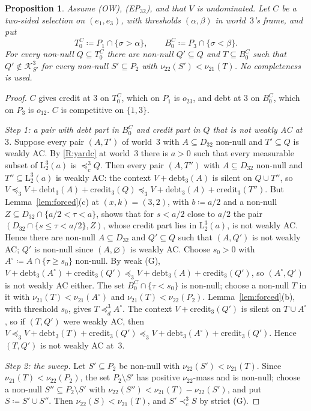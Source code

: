 \documentclass[11pt]{article}
\newtheorem{proposition}[theorem]{Proposition}
\theoremstyle{definition}\newtheorem{definition}[theorem]{Definition}
\theoremstyle{remark}\newtheorem{remark}[theorem]{Remark}
\newcommand{\debt}{\mathrm{debt}}
\newcommand{\cred}{\mathrm{credit}}
\newcommand{\Kid}{\mathcal K}
\newcommand{\Lo}[3]{\mathrm L^{#1}_{#2}(#3)}
\begin{document}
\begin{proposition}\label{prop:heavy3}
Assume (OW), (EP$_{32}$), and that $V$ is undominated. Let $C$ be a
two-sided selection on $(e_1,e_3)$, with thresholds $(\alpha,\beta)$ in
world~$3$'s frame, and put
\[
 T^C_0\coloneqq P_1\cap\{\sigma>\alpha\},\qquad
 B^C_0\coloneqq P_3\cap\{\sigma<\beta\}.
\]
For every non-null $Q\subseteq T^C_0$ there are non-null $Q'\subseteq Q$ and
$T\subseteq B^C_0$ such that $Q'\notin\Kid^3_{S'}$ for every non-null
$S'\subseteq P_2$ with $\nu_{22}(S')<\nu_{21}(T)$. No completeness is used.
\end{proposition}
\begin{proof}
$C$ gives credit at $3$ on $T^C_0$, which on $P_1$ is $o_{23}$, and debt at
$3$ on $B^C_0$, which on $P_3$ is $o_{12}$. $C$ is competitive on
$\{1,3\}$.

\emph{Step 1: a pair with debt part in $B^C_0$ and credit part in $Q$ that
is not weakly AC at~$3$.} Suppose every pair $(A,T')$ of world~$3$ with
$A\subseteq D_{32}$ non-null and $T'\subseteq Q$ is weakly AC. By
\ref{R:yardc} at world~$3$ there is $a>0$ such that every measurable subset
of $\Lo32a$ is $\preceq^3_cQ$. Then every pair $(A,T'')$ with $A\subseteq
D_{32}$ non-null and $T''\subseteq\Lo32a$ is weakly AC: the context
$V+\debt_3(A)$ is silent on $Q\cup T''$, so
$V\preceq_3V+\debt_3(A)+\cred_3(Q)\preceq_3V+\debt_3(A)+\cred_3(T'')$. But
Lemma~\ref{lem:forced}(c) at $(x,k)=(3,2)$, with $b\coloneqq a/2$ and a
non-null $Z\subseteq D_{32}\cap\{a/2<\tau<a\}$, shows that for $s<a/2$
close to $a/2$ the pair $(D_{32}\cap\{s\le\tau<a/2\},Z)$, whose credit
part lies in $\Lo32a$, is not weakly AC. Hence there are non-null $A\subseteq D_{32}$ and
$Q'\subseteq Q$ such that $(A,Q')$ is not weakly AC; $Q'$ is non-null since
$(A,\varnothing)$ is weakly AC. Choose $s_0>0$ with $A^\circ\coloneqq
A\cap\{\tau\ge s_0\}$ non-null. By weak (G),
$V+\debt_3(A^\circ)+\cred_3(Q')\preceq_3V+\debt_3(A)+\cred_3(Q')$, so
$(A^\circ,Q')$ is not weakly AC either. The set $B^C_0\cap\{\tau<s_0\}$ is
non-null; choose a non-null $T$ in it with $\nu_{21}(T)<\nu_{21}(A^\circ)$
and $\nu_{21}(T)<\nu_{22}(P_2)$. Lemma~\ref{lem:forced}(b), with threshold
$s_0$, gives $T\preceq^3_dA^\circ$. The context $V+\cred_3(Q')$ is silent on
$T\cup A^\circ$, so if $(T,Q')$ were weakly AC, then
$V\preceq_3V+\debt_3(T)+\cred_3(Q')\preceq_3V+\debt_3(A^\circ)+\cred_3(Q')$.
Hence $(T,Q')$ is not weakly AC at~$3$.

\emph{Step 2: the sweep.} Let $S'\subseteq P_2$ be non-null with
$\nu_{22}(S')<\nu_{21}(T)$. Since $\nu_{21}(T)<\nu_{22}(P_2)$, the set
$P_2\setminus S'$ has positive $\nu_{22}$-mass and is non-null; choose a
non-null $S''\subseteq P_2\setminus S'$ with
$\nu_{22}(S'')<\nu_{21}(T)-\nu_{22}(S')$, and put $S\coloneqq S'\cup S''$.
Then $\nu_{22}(S)<\nu_{21}(T)$, and $S'\prec^3_cS$ by strict (G).


\end{proof}
\end{document}
